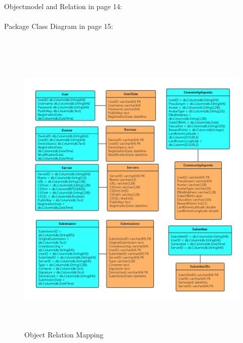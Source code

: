 \documentclass[12pt,oneside,a4paper]{article}
\begin{document}
\small{Objectmodel and Relation in page 14:}\\\\
\small{Package Class Diagram in page 15:}\\\\
\begin{figure}[htb]
\centering
\includegraphics[width=450px, height=550px]{ormd.png}
\caption{Object Relation Mapping}
\label{picture-label13}
\end{figure}\\
\end{document}
